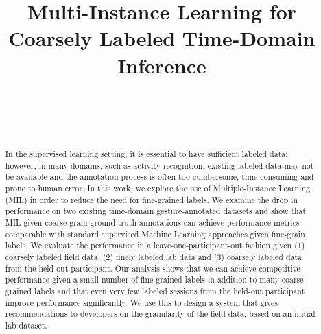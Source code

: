 \documentclass{sigchi}
\begin{document}
\title{Multi-Instance Learning for Coarsely Labeled Time-Domain Inference}

\author{%
  \\
  \\
  \\
}

\maketitle

\begin{abstract}
  In the supervised learning setting, it is essential to have sufficient labeled data; however, in many domains, such as activity recognition, existing labeled data may not be available and the annotation process is often too cumbersome, time-consuming and prone to human error. In this work, we explore the use of Multiple-Instance Learning (MIL) in order to reduce the need for fine-grained labels. We examine the drop in performance on two existing time-domain gesture-annotated datasets and show that MIL given coarse-grain ground-truth annotations can achieve performance metrics comparable with standard supervised Machine Learning approaches given fine-grain labels. We evaluate the performance in a leave-one-participant-out fashion given (1) coarsely labeled field data, (2) finely labeled lab data and (3) coarsely labeled data from the held-out participant. Our analysis shows that we can achieve competitive performance given a small number of fine-grained labels in addition to many coarse-grained labels and that even very few labeled sessions from the held-out participant improve performance significantly. We use this to design a system that gives recommendations to developers on the granularity of the field data, based on an initial lab dataset.
\end{abstract}
\end{document}
